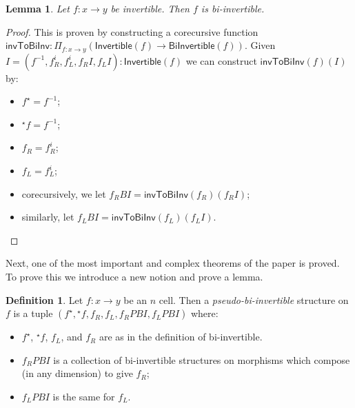 \documentclass{article}
\newtheorem{lemma}{Lemma}
\theoremstyle{definition}
\newtheorem{definition}{Definition}
\theoremstyle{remark}
\newcommand{\linv}[1]{{}^\star\!#1}
\newcommand{\rinv}[1]{#1^\star}
\newcommand{\inv}[1]{#1^{-1}}
\begin{document}
\begin{lemma}\label{inv-to-bi-inv}
  Let \(f : x \to y\) be invertible. Then \(f\) is bi-invertible.
\end{lemma}

\begin{proof}
  This is proven by constructing a corecursive function \(\mathsf{invToBiInv} : \Pi_{f : x \to y} (\mathsf{Invertible}(f) \to \mathsf{BiInvertible}(f))\). Given \(I = (\inv f,f_R^i,f_L^i,f_R{}I, f_L{}I) : \mathsf{Invertible}(f)\) we can construct \(\mathsf{invToBiInv}(f)(I)\) by:
  \begin{itemize}
  \item \(\rinv f = \inv f\);
  \item \(\linv f = \inv f\);
  \item \(f_R = f_R^i\);
  \item \(f_L = f_L^i\);
  \item corecursively, we let \(f_R{}BI = \mathsf{invToBiInv}(f_R)(f_R{}I)\);
  \item similarly, let \(f_L{}BI = \mathsf{invToBiInv}(f_L)(f_L{}I)\).
  \end{itemize}
\end{proof}

\noindent Next, one of the most important and complex theorems of the paper is proved. To prove this we introduce a new notion and prove a lemma.

\begin{definition}
  Let \(f : x \to y\) be an \(n\) cell. Then a \emph{pseudo-bi-invertible} structure on \(f\) is a tuple \((\rinv f, \linv f, f_R, f_L, f_R{}PBI, f_L{}PBI)\) where:
  \begin{itemize}
  \item \(\rinv f\), \(\linv f\), \(f_L\), and \(f_R\) are as in the definition of bi-invertible.
  \item \(f_R{}PBI\) is a collection of bi-invertible structures on morphisms which compose (in any dimension) to give \(f_R\);
  \item \(f_L{}PBI\) is the same for \(f_L\).
  \end{itemize}
\end{definition}
\end{document}
